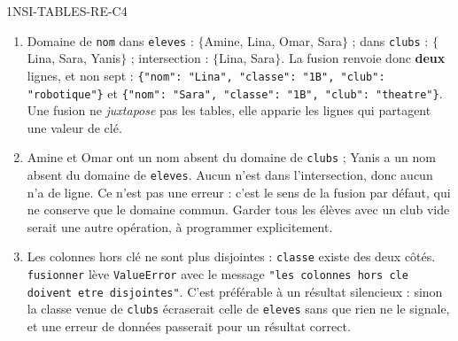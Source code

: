 \begin{corrige}{1NSI-TABLES-RE-C4}
\begin{enumerate}
  \item Domaine de \lstinline{nom} dans \lstinline{eleves} : $\{$Amine, Lina, Omar, Sara$\}$ ;
        dans \lstinline{clubs} : $\{$Lina, Sara, Yanis$\}$ ; intersection : $\{$Lina, Sara$\}$.
        La fusion renvoie donc \textbf{deux} lignes, et non sept :
        \lstinline|{"nom": "Lina", "classe": "1B", "club": "robotique"}| et
        \lstinline|{"nom": "Sara", "classe": "1B", "club": "theatre"}|. Une fusion ne
        \emph{juxtapose} pas les tables, elle apparie les lignes qui partagent une valeur de
        clé.
  \item Amine et Omar ont un nom absent du domaine de \lstinline{clubs} ; Yanis a un nom
        absent du domaine de \lstinline{eleves}. Aucun n'est dans l'intersection, donc aucun
        n'a de ligne. Ce n'est pas une erreur : c'est le sens de la fusion par défaut, qui ne
        conserve que le domaine commun. Garder tous les élèves avec un club vide serait une
        autre opération, à programmer explicitement.
  \item Les colonnes hors clé ne sont plus disjointes : \lstinline{classe} existe des deux
        côtés. \lstinline{fusionner} lève \lstinline{ValueError} avec le message
        \lstinline{"les colonnes hors cle doivent etre disjointes"}. C'est préférable à un résultat
        silencieux : sinon la classe venue de \lstinline{clubs} écraserait celle de
        \lstinline{eleves} sans que rien ne le signale, et une erreur de données passerait
        pour un résultat correct.
\end{enumerate}
\end{corrige}

